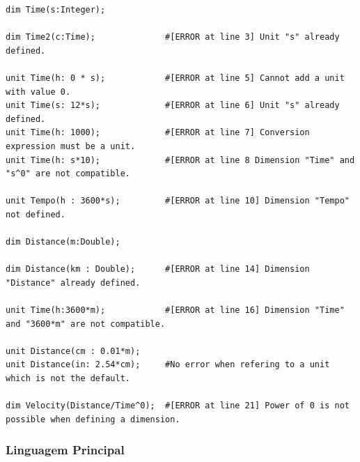 \documentclass[10pt,portuguese]{article}
\begin{document}
\begin{lstlisting}
dim Time(s:Integer);

dim Time2(c:Time);              #[ERROR at line 3] Unit "s" already defined.

unit Time(h: 0 * s);            #[ERROR at line 5] Cannot add a unit with value 0.
unit Time(s: 12*s);             #[ERROR at line 6] Unit "s" already defined.
unit Time(h: 1000);             #[ERROR at line 7] Conversion expression must be a unit.
unit Time(h: s*10);             #[ERROR at line 8 Dimension "Time" and "s^0" are not compatible.

unit Tempo(h : 3600*s);         #[ERROR at line 10] Dimension "Tempo" not defined.

dim Distance(m:Double);

dim Distance(km : Double);      #[ERROR at line 14] Dimension "Distance" already defined.

unit Time(h:3600*m);            #[ERROR at line 16] Dimension "Time" and "3600*m" are not compatible.

unit Distance(cm : 0.01*m);
unit Distance(in: 2.54*cm);     #No error when refering to a unit which is not the default.

dim Velocity(Distance/Time^0);  #[ERROR at line 21] Power of 0 is not possible when defining a dimension.
\end{lstlisting}

\subsubsection{Linguagem Principal}
\end{document}
